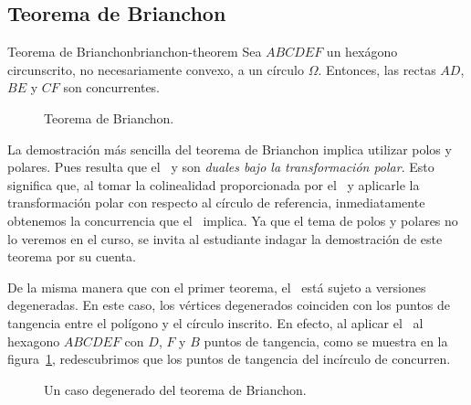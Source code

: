 \subsection{Teorema de Brianchon}

\begin{section-theorem.tcb}{Teorema de Brianchon}{brianchon-theorem}
    Sea $ABCDEF$ un hexágono circunscrito, no necesariamente convexo, a un círculo $\Omega$.
    Entonces, las rectas $AD$, $BE$ y $CF$ son concurrentes.
\end{section-theorem.tcb}

\begin{figure}[H]
    \centering
    
    \caption{Teorema de Brianchon.}
\end{figure}

La demostración más sencilla del teorema de Brianchon implica utilizar polos y polares.
Pues resulta que el~ y  son \textit{duales bajo la transformación polar}.
Esto significa que, al tomar la colinealidad proporcionada por el~ y aplicarle la transformación polar con respecto al círculo de referencia, inmediatamente obtenemos la concurrencia que el~ implica.
Ya que el tema de polos y polares no lo veremos en el curso, se invita al estudiante indagar la demostración de este teorema por su cuenta.

De la misma manera que con el primer teorema, el~ está sujeto a versiones degeneradas.
En este caso, los vértices degenerados coinciden con los puntos de tangencia entre el polígono y el círculo inscrito.
En efecto, al aplicar el~ al hexagono $ABCDEF$ con $D$, $F$ y $B$ puntos de tangencia, como se muestra en la figura~\ref{fig:case-briancho-theorem}, redescubrimos que los puntos de tangencia del incírculo de  concurren.

\begin{figure}[H]
    \centering
    
    \caption{Un caso degenerado del teorema de Brianchon.}
    \label{fig:case-briancho-theorem}
\end{figure}

